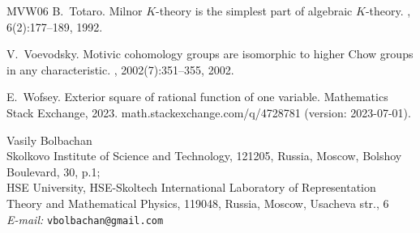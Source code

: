 \documentclass[12pt]{extarticle}
\begin{document}
\begin{thebibliography}{MVW06}
B.~Totaro.
\newblock Milnor {$K$}-theory is the simplest part of algebraic {$K$}-theory.
, 6(2):177--189, 1992.

V.~Voevodsky.
\newblock Motivic cohomology groups are isomorphic to higher {C}how groups in any characteristic.
, 2002(7):351--355, 2002.

E.~Wofsey.
\newblock Exterior square of rational function of one variable.
\newblock Mathematics Stack Exchange, 2023.
\newblock math.stackexchange.com/q/4728781 (version: 2023-07-01).

\end{thebibliography}
Vasily Bolbachan\\
Skolkovo Institute of Science and Technology, 121205, Russia, Moscow, Bolshoy Boulevard, 30, p.1;\\ HSE University, HSE-Skoltech International Laboratory of Representation
Theory and Mathematical Physics, 119048, Russia, Moscow, Usacheva str., 6\\
\emph{E-mail:} \texttt{vbolbachan{\selectfont @}gmail.com}
\end{document}
